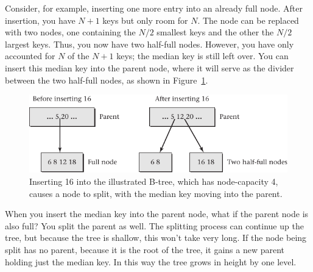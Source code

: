 Consider, for example, inserting one more entry into an already full
node.  After insertion, you have $N+1$ keys but only room for $N$.  The node
can be replaced with two nodes, one containing the $N/2$ smallest keys
and the other the $N/2$ largest keys.  Thus, you now have two half-full
nodes.  However, you have only accounted for $N$ of the $N+1$ keys; the
median key is still left over.  You can insert this median key into the
parent node, where it will serve as the divider between the two
half-full nodes, as shown in Figure~\ref{B-tree-split}.
\begin{figure}
\centerline{\includegraphics{hail_f0812}}
\caption{Inserting 16 into the illustrated B-tree, which has
node-capacity 4, causes a node to split, with the median key moving
into the parent.}
\label{B-tree-split}
\end{figure}

When you insert the median key into the parent node, what if the
parent node is also full?  You split the parent as well.  The splitting
process can continue up the tree, but because the tree is shallow, this
won't take very long.  If the node being split has no parent, because
it is the root of the tree, it gains a new parent holding just the
median key.  In this way the tree grows in height by one level.

